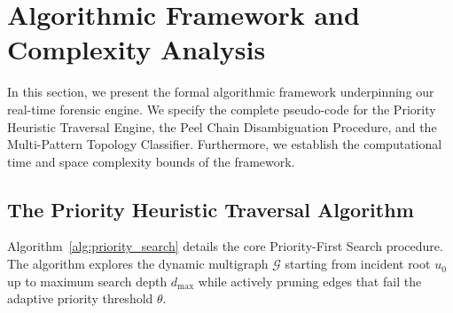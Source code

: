 \section{Algorithmic Framework and Complexity Analysis}
\label{sec:algorithms}

In this section, we present the formal algorithmic framework underpinning our real-time forensic engine. We specify the complete pseudo-code for the Priority Heuristic Traversal Engine, the Peel Chain Disambiguation Procedure, and the Multi-Pattern Topology Classifier. Furthermore, we establish the computational time and space complexity bounds of the framework.

\subsection{The Priority Heuristic Traversal Algorithm}

Algorithm~\ref{alg:priority_search} details the core Priority-First Search procedure. The algorithm explores the dynamic multigraph $\mathcal{G}$ starting from incident root $u_0$ up to maximum search depth $d_{\max}$ while actively pruning edges that fail the adaptive priority threshold $\theta$.


